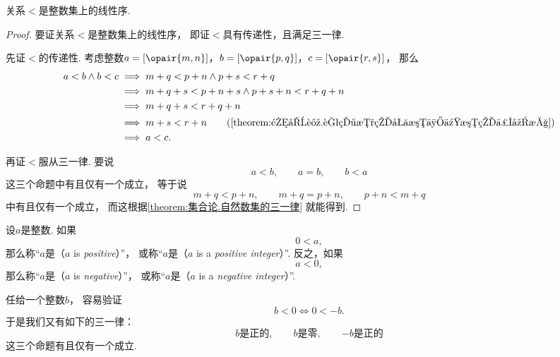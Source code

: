 \begin{theorem}\label{theorem:集合论.整数集上的序是线性序}
关系\(<\)是整数集上的线性序.
\begin{proof}
要证关系\(<\)是整数集上的线性序，
即证\(<\)具有传递性，且满足三一律.

先证\(<\)的传递性.
考虑整数\(a=[\opair{m,n}]\)，\(b=[\opair{p,q}]\)，\(c=[\opair{r,s}]\)，
那么\begin{align*}
	a<b \land b<c
	&\implies
	m+q<p+n \land p+s<r+q \\
	&\implies
	m+q+s<p+n+s \land p+s+n<r+q+n \\
	&\implies
	m+q+s<r+q+n \\
	&\implies
	m+s<r+n
		\tag{\cref{theorem:集合论.自然数的加法与乘法的保序性}} \\
	&\implies
	a < c.
\end{align*}

再证\(<\)服从三一律.
要说\begin{equation*}
	a < b, \qquad
	a = b, \qquad
	b < a
\end{equation*}这三个命题中有且仅有一个成立，
等于说\begin{equation*}
	m+q<p+n, \qquad
	m+q=p+n, \qquad
	p+n<m+q
\end{equation*}中有且仅有一个成立，
而这根据\cref{theorem:集合论.自然数集的三一律} 就能得到.
\end{proof}
\end{theorem}

\begin{definition}
设\(a\)是整数.
如果\begin{equation*}
	0 < a,
\end{equation*}
那么称“\(a\)是（\(a\) is \emph{positive}）”，
或称“\(a\)是（\(a\) is a \emph{positive integer}）”.
反之，如果\begin{equation*}
	a < 0,
\end{equation*}
那么称“\(a\)是（\(a\) is \emph{negative}）”，
或称“\(a\)是（\(a\) is a \emph{negative integer}）”.
\end{definition}

任给一个整数\(b\)，
容易验证\begin{equation*}
	b < 0 \iff 0 < -b.
\end{equation*}
于是我们又有如下的三一律：
\begin{equation*}
	\text{\(b\)是正的}, \qquad
	\text{\(b\)是零}, \qquad
	\text{\(-b\)是正的}
\end{equation*}这三个命题有且仅有一个成立.

